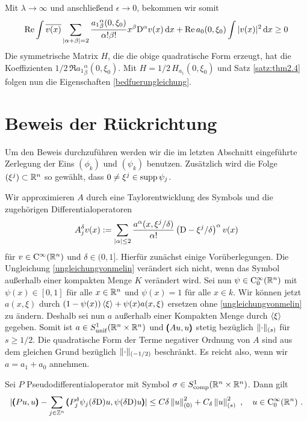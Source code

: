 Mit $\lambda\to\infty$ und anschließend $\epsilon \to 0$, bekommen wir somit
\begin{align}
\operatorname{Re}\int \overline{v(x)}\sum_{\lvert\alpha+\beta\rvert=2}\frac{{a_1}^\alpha_\beta(0,\xi_0)}{\alpha!\beta!}x^\beta\mathrm D^\alpha v(x)\,\mathrm d x + \operatorname{Re} a_0(0,\xi_0)\int|v(x)|^2\,\mathrm d x\ge 0
\end{align}
Die symmetrische Matrix $H$, die die obige quadratische Form erzeugt, hat die Koeffizienten $1/2\,\Re {a_1}^\alpha_\beta(0,\xi_0)$. Mit $H=1/2\, H_{a_1}(0,\xi_0)$ und Satz \ref{satz:thm2.4} folgen nun die Eigenschaften \eqref{bedfuerungleichung}.

\section{Beweis der Rückrichtung}

Um den Beweis durchzuführen werden wir die im letzten Abschnitt eingeführte Zerlegung der Eins $(\phi_k)$ und $(\psi_k)$ benutzen. Zusätzlich wird die Folge $(\xi^j)\subset \mathbb R^n$ so gewählt, dass $0\neq \xi^j\in\operatorname{supp} \psi_j$.

Wir approximieren $A$ durch eine Taylorentwicklung des Symbols und die zugehörigen Differentialoperatoren
\begin{align}
 A_j^\delta v (x):=\sum_{\lvert\alpha\rvert \le 2} \frac{a^\alpha(x,\xi^j/\delta)}{\alpha!}\left( \mathrm D - \xi^j/\delta\right)^\alpha v(x)
\end{align}
für $v\in\mathrm {C}^\infty(\mathbb R^n)$ und $\delta\in(0,1]$. Hierfür zunächst einige Vorüberlegungen. Die Ungleichung \eqref{ungleichungvonmelin} verändert sich nicht, wenn das Symbol außerhalb einer kompakten Menge $K$ verändert wird. Sei nun $\psi\in\mathrm{C}^\infty_0(\mathbb R^n)$ mit $\psi(x)\in[0,1]$ für alle $x\in\mathbb R^n$ und $\psi(x)=1$ für alle $x\in k$. Wir können jetzt $a(x,\xi)$ durch $(1-\psi(x))\braket{\xi} + \psi(x)a(x,\xi)$ ersetzen ohne \eqref{ungleichungvonmelin} zu ändern. Deshalb sei nun $a$ außerhalb einer Kompakten Menge durch $\braket{\xi}$ gegeben. Somit ist $a\in S_\mathrm{unif}^1(\mathbb R^n\times\mathbb R^n)$ und $\pmb(Au,u\pmb)$ stetig bezüglich $\lVert\cdot\rVert _{(s)}$ für $s\ge 1/2$. Die quadratische Form der Terme negativer Ordnung von $A$ sind aus dem gleichen Grund bezüglich $\lVert\cdot\rVert _{(-1/2)}$ beschränkt. Es reicht also, wenn wir $a=a_1+a_0$ annehmen.

\begin{lem}
Sei $P$ Pseudodifferentialoperator mit Symbol $\sigma\in S^1_{\rm comp}(\mathbb R^n\times\mathbb R^n)$. Dann gilt
\begin{align}\label{hilfsungl1}
\lvert
\pmb(P u,u\pmb) - \sum_{j\in\mathbb Z^n}\pmb( P_j^\delta\psi_j(\delta\mathrm D )u, \psi(\delta\mathrm D )u \pmb)
\rvert
\le C\delta \left\lVert u\right\rVert ^2_{(0)} + C_\delta \left\lVert u\right\rVert ^2_{(s)}\ ,\quad u\in\mathrm {C}^\infty_0(\mathbb R^n)\ .
\end{align}
\end{lem}


